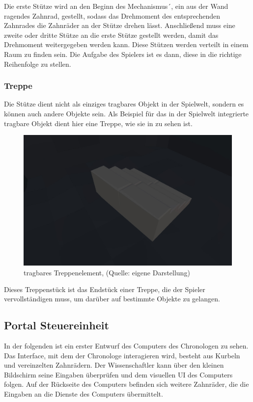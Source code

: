 Die erste Stütze wird an den Beginn des Mechanismus´, ein aus der Wand ragendes Zahnrad, gestellt, sodass das Drehmoment des entsprechenden Zahnrades die Zahnräder an der Stütze drehen lässt. Anschließend muss eine zweite oder dritte Stütze an die erste Stütze gestellt werden, damit das Drehmoment weitergegeben werden kann. Diese Stützen werden verteilt in einem Raum zu finden sein. Die Aufgabe des Spielers ist es dann, diese in die richtige Reihenfolge zu stellen.

\subsubsection{Treppe}
Die Stütze dient nicht als einziges tragbares Objekt in der Spielwelt, sondern es können auch andere Objekte sein. Als Beispiel für das in der Spielwelt integrierte tragbare Objekt dient hier eine Treppe, wie sie in  zu sehen ist. 

\begin{figure}[ht]
\centering
\includegraphics[width=0.8\linewidth]{content/pictures/Stairs.jpg}
\caption{tragbares Treppenelement, (Quelle: eigene Darstellung)}
\label{fig:stairs}
\end{figure}

Dieses Treppenstück ist das Endstück einer Treppe, die der Spieler vervollständigen muss, um darüber auf bestimmte Objekte zu gelangen.

\subsection{Portal Steuereinheit}\label{sec:portal}
In der folgenden  ist ein erster Entwurf des Computers des Chronologen zu sehen. Das Interface, mit dem der Chronologe interagieren wird, besteht aus Kurbeln und vereinzelten Zahnrädern. Der Wissenschaftler kann über den kleinen Bildschirm seine Eingaben überprüfen und dem visuellen \ac{UI} des Computers folgen. Auf der Rückseite des Computers befinden sich weitere Zahnräder, die die Eingaben an die Dienste des Computers übermittelt. 

